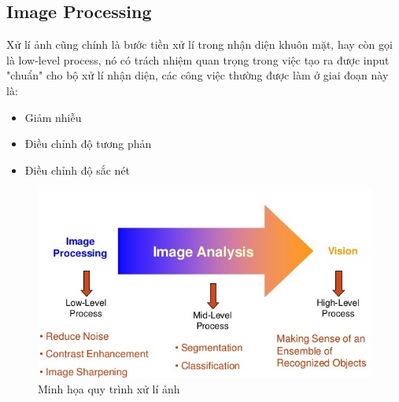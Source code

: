 \documentclass[a4paper]{report}
\begin{document}
\subsection*{Image Processing}
Xử lí ảnh cũng chính là bước tiền xử lí trong nhận diện khuôn mặt, hay còn gọi là low-level process, nó có trách nhiệm quan trọng trong việc tạo ra được input "chuẩn" cho bộ xử lí nhận diện, các công việc thường được làm ở giai đoạn này là:
\begin{itemize}
\item Giảm nhiễu
\item Điều chỉnh độ tương phản
\item Điều chỉnh độ sắc nét
\end{itemize}
%
\begin{figure}[H]
\centering
\includegraphics[scale=.5]{../images/fig/imgpro.jpg}
\caption{Minh họa quy trình xử lí ảnh}
\label{fig:imgpro}
\end{figure}
%
\end{document}
